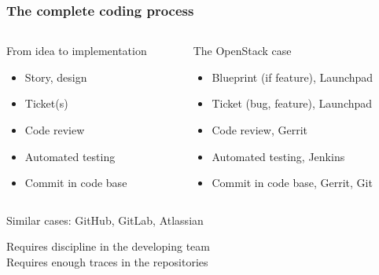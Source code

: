 \documentclass[17pt,aspectratio=169,hyperref=pdfusetitle]{beamer}
\begin{document}

\begin{frame}
\frametitle{The complete coding process}

\begin{columns}[T]
\begin{column}{.40\textwidth}

  From idea to implementation
  
\begin{itemize}
\item Story, design
\item Ticket(s)
\item Code review
\item Automated testing
\item Commit in code base
\end{itemize}

\end{column}%
\hfill%
\begin{column}{.58\textwidth}

  The OpenStack case

\begin{itemize}
\item Blueprint (if feature), Launchpad
\item Ticket (bug, feature), Launchpad
\item Code review, Gerrit
\item Automated testing, Jenkins
\item Commit in code base, Gerrit, Git
\end{itemize}

\end{column}%
\end{columns}

\vspace{.4cm}

\begin{center}
Similar cases: GitHub, GitLab, Atlassian \\

\vspace{.4cm}

{\Large
  Requires discipline in the developing team \\

  Requires enough traces in the repositories \\
}
\end{center}
\end{frame}

\end{document}
